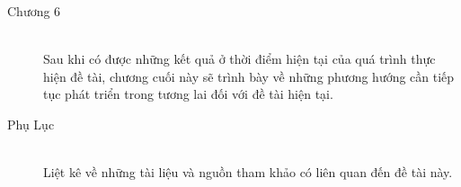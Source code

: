 \begin{description}
	\item[Chương 6] \hfill \\
	 Sau khi có được những kết quả ở thời điểm hiện tại của quá trình thực hiện đề tài, chương cuối này sẽ trình bày về những phương hướng cần tiếp tục phát triển trong tương lai đối với đề tài hiện tại.\\
	\item[Phụ Lục] \hfill \\
	 Liệt kê về những tài liệu và nguồn tham khảo có liên quan đến đề tài này.\\
\end{description}
